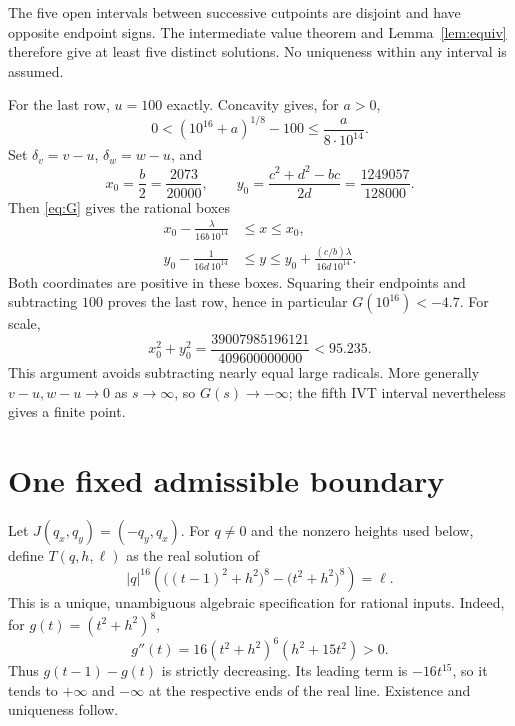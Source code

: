 \documentclass[11pt]{article}
\begin{document}
The five open intervals between successive cutpoints are disjoint and have opposite endpoint signs. The intermediate value theorem and Lemma~\ref{lem:equiv} therefore give at least five distinct solutions. No uniqueness within any interval is assumed.

For the last row, $u=100$ exactly. Concavity gives, for $a>0$,
\[
 0<(10^{16}+a)^{1/8}-100\leq \frac{a}{8\cdot10^{14}}.
\]
Set $\delta_v=v-u$, $\delta_w=w-u$, and
\[
 x_0=\frac b2=\frac{2073}{20000},\qquad
 y_0=\frac{c^2+d^2-bc}{2d}=\frac{1249057}{128000}.
\]
Then \eqref{eq:G} gives the rational boxes
\begin{align*}
 x_0-\frac{\lambda}{16b\,10^{14}}&\leq x\leq x_0,\\
 y_0-\frac{1}{16d\,10^{14}}&\leq y\leq
 y_0+\frac{(c/b)\lambda}{16d\,10^{14}}.
\end{align*}
Both coordinates are positive in these boxes. Squaring their endpoints and subtracting $100$ proves the last row, hence in particular $G(10^{16})<-4.7$. For scale,
\[
 x_0^2+y_0^2=\frac{39007985196121}{409600000000}<95.235.
\]
This argument avoids subtracting nearly equal large radicals. More generally $v-u,w-u\to0$ as $s\to\infty$, so $G(s)\to-\infty$; the fifth IVT interval nevertheless gives a finite point.

\section{One fixed admissible boundary}
Let $J(q_x,q_y)=(-q_y,q_x)$. For $q\ne0$ and the nonzero heights used below, define $T(q,h,\ell)$ as the real solution of
\begin{equation}\label{eq:T}
 |q|^{16}\left(\big((t-1)^2+h^2\big)^8-\big(t^2+h^2\big)^8\right)=\ell.
\end{equation}
This is a unique, unambiguous algebraic specification for rational inputs. Indeed, for $g(t)=(t^2+h^2)^8$,
\[
 g''(t)=16(t^2+h^2)^6(h^2+15t^2)>0.
\]
Thus $g(t-1)-g(t)$ is strictly decreasing. Its leading term is $-16t^{15}$, so it tends to $+\infty$ and $-\infty$ at the respective ends of the real line. Existence and uniqueness follow.
\end{document}
